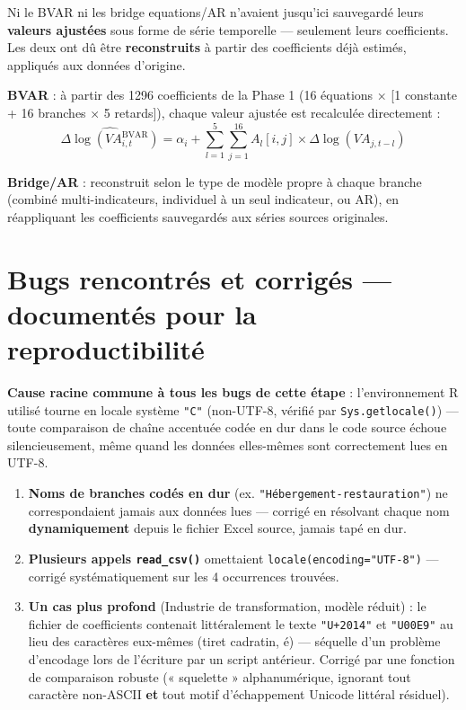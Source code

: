 \documentclass[11pt,a4paper]{article}
\begin{document}
\begin{intuition}
Ni le BVAR ni les bridge equations/AR n'avaient jusqu'ici sauvegardé leurs \textbf{valeurs ajustées} sous forme de série temporelle --- seulement leurs coefficients. Les deux ont dû être \textbf{reconstruits} à partir des coefficients déjà estimés, appliqués aux données d'origine.
\end{intuition}

\textbf{BVAR} : à partir des 1296 coefficients de la Phase 1 (16 équations × [1 constante + 16 branches × 5 retards]), chaque valeur ajustée est recalculée directement :
\begin{equation}
\widehat{\Delta\log(VA_{i,t}^{\text{BVAR}})} = \alpha_i + \sum_{l=1}^{5}\sum_{j=1}^{16} A_l[i,j]\times\Delta\log(VA_{j,t-l})
\end{equation}

\textbf{Bridge/AR} : reconstruit selon le type de modèle propre à chaque branche (combiné multi-indicateurs, individuel à un seul indicateur, ou AR), en réappliquant les coefficients sauvegardés aux séries sources originales.

\section{Bugs rencontrés et corrigés --- documentés pour la reproductibilité}

\begin{alertebox}
\textbf{Cause racine commune à tous les bugs de cette étape} : l'environnement R utilisé tourne en locale système \texttt{"C"} (non-UTF-8, vérifié par \texttt{Sys.getlocale()}) --- toute comparaison de chaîne accentuée codée en dur dans le code source échoue silencieusement, même quand les données elles-mêmes sont correctement lues en UTF-8.
\end{alertebox}

\begin{enumerate}[leftmargin=1.4em]
\item \textbf{Noms de branches codés en dur} (ex. \texttt{"Hébergement-restauration"}) ne correspondaient jamais aux données lues --- corrigé en résolvant chaque nom \textbf{dynamiquement} depuis le fichier Excel source, jamais tapé en dur.
\item \textbf{Plusieurs appels \texttt{read\_csv()}} omettaient \texttt{locale(encoding="UTF-8")} --- corrigé systématiquement sur les 4 occurrences trouvées.
\item \textbf{Un cas plus profond} (Industrie de transformation, modèle réduit) : le fichier de coefficients contenait littéralement le texte \texttt{"U+2014"} et \texttt{"U00E9"} au lieu des caractères eux-mêmes (tiret cadratin, é) --- séquelle d'un problème d'encodage lors de l'écriture par un script antérieur. Corrigé par une fonction de comparaison robuste (« squelette » alphanumérique, ignorant tout caractère non-ASCII \textbf{et} tout motif d'échappement Unicode littéral résiduel).
\end{enumerate}
\end{document}
